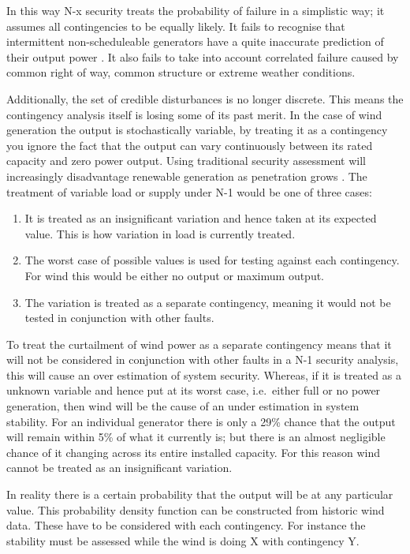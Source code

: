\documentclass[a4paper,oneside,12pt]{report}
\begin{document}
In this way N-x security treats the probability of failure in a simplistic way; it assumes all contingencies to be equally likely. It fails to recognise that intermittent non-scheduleable generators have a quite inaccurate prediction of their output power \cite{Bathurst2002}. It also fails to take into account correlated failure caused by common right of way, common structure or extreme weather conditions.

Additionally, the set of credible disturbances is no longer discrete. This means the contingency analysis itself is losing some of its past merit. In the case of wind generation the output is stochastically variable, by treating it as a contingency you ignore the fact that the output can vary continuously between its rated capacity and zero power output. Using traditional security assessment will increasingly disadvantage renewable generation as penetration grows \cite{BWEA2006}. The treatment of variable load or supply under N-1 would be one of three cases:

\begin{enumerate}
  \item It is treated as an insignificant variation and hence taken at its expected value. This is how variation in load is currently treated.
  \item The worst case of possible values is used for testing against each contingency. For wind this would be either no output or maximum output.
  \item The variation is treated as a separate contingency, meaning it would not be tested in conjunction with other faults.
\end{enumerate}

To treat the curtailment of wind power as a separate contingency means that it will not be considered in conjunction with other faults in a N-1 security analysis, this will cause an over estimation of system security. Whereas, if it is treated as a unknown variable and hence put at its worst case, i.e.\ either full or no power generation, then wind will be the cause of an under estimation in system stability. For an individual generator there is only a 29\% chance that the output will remain within 5\% of what it currently is; but there is an almost negligible chance of it changing across its entire installed capacity. For this reason wind cannot be treated as an insignificant variation.

In reality there is a certain probability that the output will be at any particular value. This probability density function can be constructed from historic wind data. These have to be considered with each contingency. For instance the stability must be assessed while the wind is doing X with contingency Y.
\end{document}
